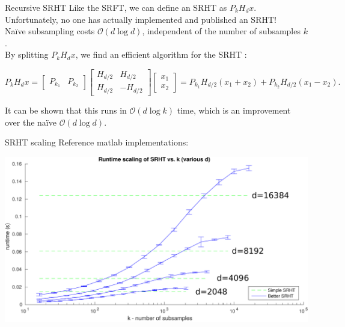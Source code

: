 \documentclass[9pt]{beamer}
\begin{document}
\begin{frame}{Recursive SRHT}
   Like the SRFT, we can define an SRHT as $P_kH_dx$.  Unfortunately, no one has actually implemented and published an SRHT!\\
   \noindent Na\"ive subsampling costs $\mathcal{O}(d\log d)$, independent of the number of subsamples $k$.\\[2em]


   By splitting $P_kH_dx$, we find an efficient algorithm for the SRHT \cite{ailon2009fast}:

   \[ P_kH_dx = \begin{bmatrix}P_{k_1}&P_{k_2}\end{bmatrix}\begin{bmatrix}H_{d/2}&H_{d/2}\\H_{d/2}&-H_{d/2}\end{bmatrix}\begin{bmatrix}x_1\\x_2\end{bmatrix} = P_{k_1}H_{d/2}(x_1+x_2) + P_{k_2}H_{d/2}(x_1-x_2). \] 

   \noindent It can be shown that this runs in $\mathcal{O}(d\log k)$ time, which is an improvement over the na\"ive $\mathcal{O}(d\log d)$.

\end{frame}

\begin{frame}{SRHT scaling}
    Reference {\sc matlab} implementations:\\

   \begin{center}
      \includegraphics[width=\textwidth]{figures/srht_matlab_ref_k_scaling_trim.pdf}
   \end{center}
\end{frame}
\end{document}
